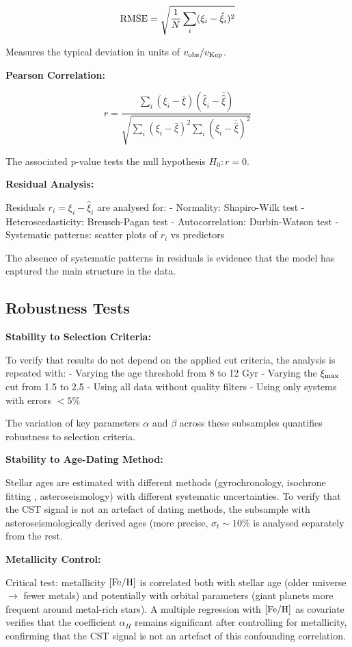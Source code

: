 \documentclass[11pt,a4paper]{article}
\begin{document}
\[{\rm RMSE} = \sqrt{\frac{1}{N}\sum_i (\xi_i - \hat\xi_i)^2}\]

Measures the typical deviation in units of \(v_{\rm obs}/v_{\rm Kep}\).

\textbf{Pearson Correlation:}

\[r = \frac{\sum_i (\xi_i - \bar\xi)(\hat\xi_i - \bar{\hat\xi})}{\sqrt{\sum_i (\xi_i-\bar\xi)^2 \sum_i (\hat\xi_i - \bar{\hat\xi})^2}}\]

The associated p-value tests the null hypothesis \(H_0: r = 0\).

\textbf{Residual Analysis:}

Residuals \(r_i = \xi_i - \hat\xi_i\) are analysed for: - Normality:
Shapiro-Wilk test - Heteroscedasticity: Breusch-Pagan test -
Autocorrelation: Durbin-Watson test - Systematic patterns: scatter plots
of \(r_i\) vs predictors

The absence of systematic patterns in residuals is evidence that the
model has captured the main structure in the data.

\hypertarget{robustness-tests}{%
\subsection{Robustness Tests}\label{robustness-tests}}

\textbf{Stability to Selection Criteria:}

To verify that results do not depend on the applied cut criteria, the
analysis is repeated with: - Varying the age threshold from 8 to 12 Gyr
- Varying the \(\xi_{\rm max}\) cut from 1.5 to 2.5 - Using all data
without quality filters - Using only systems with errors \(< 5\%\)

The variation of key parameters \(\alpha\) and \(\beta\) across these
subsamples quantifies robustness to selection criteria.

\textbf{Stability to Age-Dating Method:}

Stellar ages are estimated with different methods (gyrochronology,
isochrone fitting \cite{Dotter2017}, asteroseismology) with different systematic
uncertainties. To verify that the CST signal is not an artefact of
dating methods, the subsample with asteroseismologically derived ages
(more precise, \(\sigma_t \sim 10\%\) is analysed separately from the
rest.

\textbf{Metallicity Control:}

Critical test: metallicity \([{\rm Fe/H}]\) is correlated both with
stellar age (older universe $\rightarrow$ fewer metals) and potentially with orbital
parameters (giant planets more frequent around metal-rich stars). A
multiple regression with \([{\rm Fe/H}]\) as covariate verifies that the
coefficient \(\alpha_H\) remains significant after controlling for
metallicity, confirming that the CST signal is not an artefact of this
confounding correlation.
\end{document}
